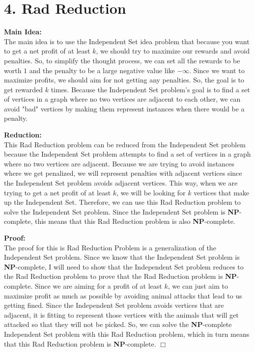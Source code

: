 \documentclass[11pt]{article}
\def\endproofmark{$\Box$}
\newenvironment{proof}{\par{\bf Proof:}}{\endproofmark\smallskip}
\newenvironment{reduction}{\par{\bf Reduction:}}{\smallskip}
\newenvironment{mainIdea}{\par{\bf Main Idea:}}{\smallskip}
\begin{document}
\newpage
\section*{4. Rad Reduction}
\begin{mainIdea}
\\
The main idea is to use the Independent Set idea problem that because you want to get a net profit of at least $k$, we should try to maximize our rewards and avoid penalties. So, to simplify the thought process, we can set all the rewards to be worth $1$ and the penalty to be a large negative value like $-\infty$. Since we want to maximize profits, we should aim for not getting any penalties. So, the goal is to get rewarded $k$ times. Because the Independent Set problem's goal is to find a set of vertices in a graph where no two vertices are adjacent to each other, we can avoid "bad" vertices by making them represent instances when there would be a penalty.
\end{mainIdea}
\\
\begin{reduction}
\\
This Rad Reduction problem can be reduced from the Independent Set problem because the Independent Set problem attempts to find a set of vertices in a graph where no two vertices are adjacent. Because we are trying to avoid instances where we get penalized, we will represent penalties with adjacent vertices since the Independent Set problem avoids adjacent vertices. This way, when we are trying to get a net profit of at least $k$, we will be looking for $k$ vertices that make up the Independent Set. Therefore, we can use this Rad Reduction problem to solve the Independent Set problem. Since the Independent Set problem is \textbf{NP}-complete, this means that this Rad Reduction problem is also \textbf{NP}-complete.
\end{reduction}
\\
\begin{proof}
\\
The proof for this is Rad Reduction Problem is a generalization of the Independent Set problem. Since we know that the Independent Set problem is \textbf{NP}-complete, I will need to show that the Independent Set problem reduces to the Rad Reduction problem to prove that the Rad Reduction problem is \textbf{NP}-complete. Since we are aiming for a profit of at least $k$, we can just aim to maximize profit as much as possible by avoiding animal attacks that lead to us getting fined. Since the Independent Set problem avoids vertices that are adjacent, it is fitting to represent those vertices with the animals that will get attacked so that they will not be picked. So, we can solve the \textbf{NP}-complete Independent Set problem with this Rad Reduction problem, which in turn means that this Rad Reduction problem is \textbf{NP}-complete.
\end{proof}
\end{document}
